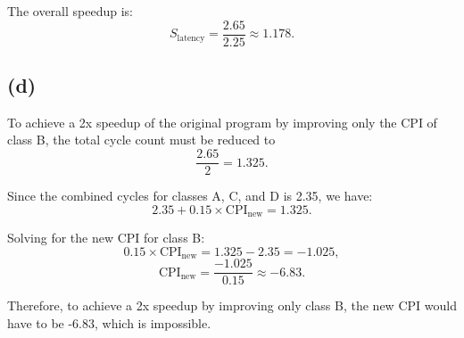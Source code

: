 \documentclass[12pt]{article}
\begin{document}
The overall speedup is:
$$
S_{\text{latency}} = \frac{2.65}{2.25} \approx 1.178.
$$

\subsection*{(d)}

To achieve a 2x speedup of the original program by improving only the CPI of class B, the total cycle count must be reduced to
$$
\frac{2.65}{2} = 1.325.
$$

Since the combined cycles for classes A, C, and D is 2.35, we have:
$$
2.35 + 0.15 \times \text{CPI}_{\text{new}} = 1.325.
$$

Solving for the new CPI for class B:
$$
0.15 \times \text{CPI}_{\text{new}} = 1.325 - 2.35 = -1.025,
$$
$$
\text{CPI}_{\text{new}} = \frac{-1.025}{0.15} \approx -6.83.
$$

Therefore, to achieve a 2x speedup by improving only class B, the new CPI would have to be -6.83, which is impossible.
\end{document}
